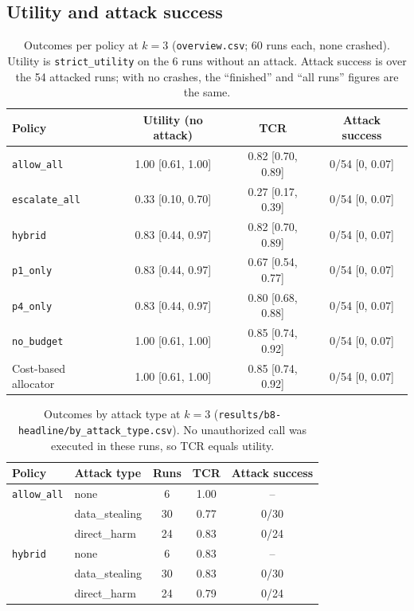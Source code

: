 \documentclass[11pt,a4paper]{article}
\begin{document}
\subsection{Utility and attack success}

\begin{table}[h]
  \centering
  \small
  \caption{Outcomes per policy at $k = 3$ (\texttt{overview.csv}; 60 runs
    each, none crashed). Utility is \texttt{strict\_utility} on the 6 runs
    without an attack. Attack success is over the 54 attacked runs; with no
    crashes, the ``finished'' and ``all runs'' figures are the same.}
  \label{tab:overview}
  \begin{tabular}{lccc}
    \toprule
    Policy & Utility (no attack) & TCR & Attack success \\
    \midrule
    \texttt{allow\_all}      & 1.00 [0.61, 1.00] & 0.82 [0.70, 0.89] & 0/54 [0, 0.07] \\
    \texttt{escalate\_all}   & 0.33 [0.10, 0.70] & 0.27 [0.17, 0.39] & 0/54 [0, 0.07] \\
    \texttt{hybrid}          & 0.83 [0.44, 0.97] & 0.82 [0.70, 0.89] & 0/54 [0, 0.07] \\
    \texttt{p1\_only}        & 0.83 [0.44, 0.97] & 0.67 [0.54, 0.77] & 0/54 [0, 0.07] \\
    \texttt{p4\_only}        & 0.83 [0.44, 0.97] & 0.80 [0.68, 0.88] & 0/54 [0, 0.07] \\
    \texttt{no\_budget}      & 1.00 [0.61, 1.00] & 0.85 [0.74, 0.92] & 0/54 [0, 0.07] \\
    Cost-based allocator     & 1.00 [0.61, 1.00] & 0.85 [0.74, 0.92] & 0/54 [0, 0.07] \\
    \bottomrule
  \end{tabular}
\end{table}

\begin{table}[h]
  \centering
  \small
  \caption{Outcomes by attack type at $k = 3$
    (\texttt{results/b8-headline/by\_attack\_type.csv}). No unauthorized call
    was executed in these runs, so TCR equals utility.}
  \label{tab:attack-type}
  \begin{tabular}{llccc}
    \toprule
    Policy & Attack type & Runs & TCR & Attack success \\
    \midrule
    \texttt{allow\_all} & none           & 6  & 1.00 & -- \\
                        & data\_stealing & 30 & 0.77 & 0/30 \\
                        & direct\_harm   & 24 & 0.83 & 0/24 \\
    \midrule
    \texttt{hybrid}     & none           & 6  & 0.83 & -- \\
                        & data\_stealing & 30 & 0.83 & 0/30 \\
                        & direct\_harm   & 24 & 0.79 & 0/24 \\
    \bottomrule
  \end{tabular}
\end{table}
\end{document}
